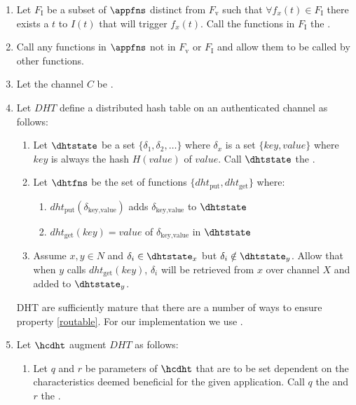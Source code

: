 \documentclass[twocolumn,showpacs,%
  nofootinbib,aps,superscriptaddress,%
  eqsecnum,prd,notitlepage,showkeys,10pt]{revtex4-1}
\begin{document}
\begin{enumerate}
\item Let $F_\mathrm{I}$ be a subset of $\appfns$ distinct from $F_\mathrm{v}$ such that $\forall f_x(t) \in F_\mathrm{I}$ there exists a $t$ to $I(t)$ that will trigger $f_x(t)$. Call the functions in $F_\mathrm{I}$ the .

\item Call any functions in $\appfns$ not in $F_\mathrm{v}$ or $F_\mathrm{I}$  and allow them to be called by other functions.
\item Let the channel $C$ be .

\item Let $DHT$ define a distributed hash table on an authenticated channel as follows:
\begin{enumerate}

\item Let $\dhtstate$ be a set $\{\delta_1,\delta_2,\dots\}$ where $\delta_x$ is a set $\{key,value\}$ where $key$ is always the hash $H(value)$ of $value$.  Call $\dhtstate$ the .
\item Let $\dhtfns$ be the set of functions $\{dht_\text{put},dht_\text{get}\}$ where:
\begin{enumerate}
\item $dht_\text{put}(\delta_\text{key,value})$ adds $\delta_\text{key,value}$ to $\dhtstate$
\item $dht_\text{get}(key) = value$ of $\delta_\text{key,value}$ in $\dhtstate$
\end{enumerate}
\item \label{routable} Assume $x,y \in N$ and $\delta_i \in \dhtstate_x$ but $\delta_i \notin \dhtstate_y$. Allow that when $y$ calls $dht_\text{get}(key)$, $\delta_i$ will be retrieved from $x$ over channel $X$ and added to $\dhtstate_y$.
\end{enumerate}
DHT are sufficiently mature that there are a number of ways to ensure property \ref{routable}.  For our implementation we use \cite{kademlia}.

\item Let $\hcdht$ augment $DHT$ as follows:
\begin{enumerate}

\item Let $q$ and $r$ be parameters of $\hcdht$ that are to be set dependent on the characteristics deemed beneficial for the given application.
Call $q$ the  and $r$ the .


\end{enumerate}
\end{enumerate}
\end{document}
